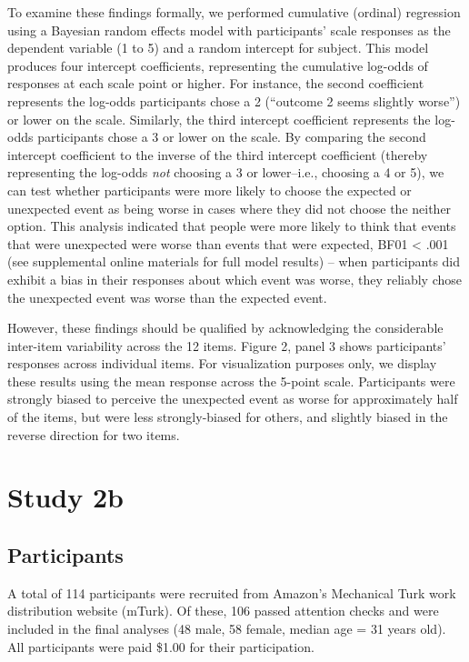 \documentclass[10pt, letterpaper]{article}
\begin{document}
To examine these findings formally, we performed cumulative (ordinal)
regression using a Bayesian random effects model with participants'
scale responses as the dependent variable (1 to 5) and a random
intercept for subject. This model produces four intercept coefficients,
representing the cumulative log-odds of responses at each scale point or
higher. For instance, the second coefficient represents the log-odds
participants chose a 2 (``outcome 2 seems slightly worse'') or lower on
the scale. Similarly, the third intercept coefficient represents the
log-odds participants chose a 3 or lower on the scale. By comparing the
second intercept coefficient to the inverse of the third intercept
coefficient (thereby representing the log-odds \emph{not} choosing a 3
or lower--i.e., choosing a 4 or 5), we can test whether participants
were more likely to choose the expected or unexpected event as being
worse in cases where they did not choose the neither option. This
analysis indicated that people were more likely to think that events
that were unexpected were worse than events that were expected, BF01
\textless{} .001 (see supplemental online materials for full model
results) -- when participants did exhibit a bias in their responses
about which event was worse, they reliably chose the unexpected event
was worse than the expected event.

However, these findings should be qualified by acknowledging the
considerable inter-item variability across the 12 items. Figure 2, panel
3 shows participants' responses across individual items. For
visualization purposes only, we display these results using the mean
response across the 5-point scale. Participants were strongly biased to
perceive the unexpected event as worse for approximately half of the
items, but were less strongly-biased for others, and slightly biased in
the reverse direction for two items.

\section{Study 2b}\label{study-2b}

\subsection{Participants}\label{participants-3}

A total of 114 participants were recruited from Amazon's Mechanical Turk
work distribution website (mTurk). Of these, 106 passed attention checks
and were included in the final analyses (48 male, 58 female, median age
= 31 years old). All participants were paid \$1.00 for their
participation.
\end{document}
